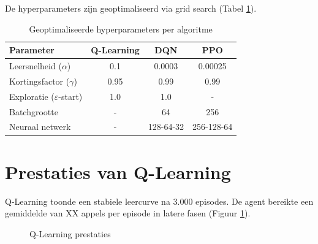 \documentclass[a4paper,11pt]{report}
\begin{document}
De hyperparameters zijn geoptimaliseerd via grid search (Tabel
\ref{tab:hyperparams}).

\begin{table}[h]
    \centering
    \caption{Geoptimaliseerde hyperparameters per algoritme}
    \begin{tabular}{|l|c|c|c|}
        \hline
        Parameter                        & Q-Learning & DQN       & PPO        \\
        \hline
        Leersnelheid ($\alpha$)          & 0.1        & 0.0003    & 0.00025    \\
        Kortingsfactor ($\gamma$)        & 0.95       & 0.99      & 0.99       \\
        Exploratie ($\varepsilon$-start) & 1.0        & 1.0       & -          \\
        Batchgrootte                     & -          & 64        & 256        \\
        Neuraal netwerk                  & -          & 128-64-32 & 256-128-64 \\
        \hline
    \end{tabular}
    \label{tab:hyperparams}
\end{table}

\section{Prestaties van Q-Learning}
Q-Learning toonde een stabiele leercurve na 3.000 episodes. De agent bereikte
een gemiddelde van XX appels per episode in latere fasen (Figuur
\ref{fig:q_learning}).

\begin{figure}[h]
    \centering
    \hfill
    \caption{Q-Learning prestaties}
    \label{fig:q_learning}
\end{figure}
\end{document}
